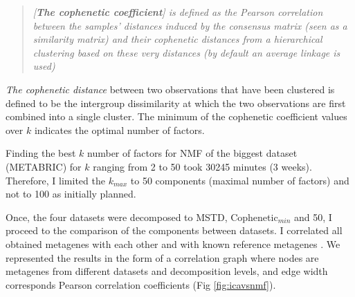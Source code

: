 \documentclass[12pt,]{book}
\theoremstyle{definition}
\theoremstyle{definition}
\theoremstyle{definition}
\theoremstyle{remark}
\begin{document}
\begin{quote}
\emph{{[}\textbf{The cophenetic coefficient}{]} is defined as the
Pearson correlation between the samples' distances induced by the
consensus matrix (seen as a similarity matrix) and their cophenetic
distances from a hierarchical clustering based on these very distances
(by default an average linkage is used)} \citep{Brunet2004}
\end{quote}

\emph{The cophenetic distance} between two observations that have been
clustered is defined to be the intergroup dissimilarity at which the two
observations are first combined into a single cluster. The minimum of
the cophenetic coefficient values over \(k\) indicates the optimal
number of factors.

Finding the best \(k\) number of factors for NMF of the biggest dataset
(METABRIC) for \(k\) ranging from 2 to 50 took 30245 minutes (3 weeks).
Therefore, I limited the \(k_{max}\) to 50 components (maximal number of
factors) and not to 100 as initially planned.

Once, the four datasets were decomposed to MSTD, Cophenetic\(_{min}\)
and 50, I proceed to the comparison of the components between datasets.
I correlated all obtained metagenes with each other and with known
reference metagenes \citep{Biton2014}. We represented the results in the
form of a correlation graph where nodes are metagenes from different
datasets and decomposition levels, and edge width corresponds Pearson
correlation coefficients (Fig \ref{fig:icavsnmf}).
\end{document}

